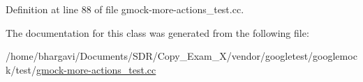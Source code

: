 Definition at line 88 of file gmock-\/more-\/actions\+\_\+test.\+cc.



The documentation for this class was generated from the following file\+:\begin{DoxyCompactItemize}
\item 
/home/bhargavi/\+Documents/\+S\+D\+R/\+Copy\+\_\+\+Exam\+\_\+X/vendor/googletest/googlemock/test/\hyperlink{gmock-more-actions__test_8cc}{gmock-\/more-\/actions\+\_\+test.\+cc}\end{DoxyCompactItemize}
